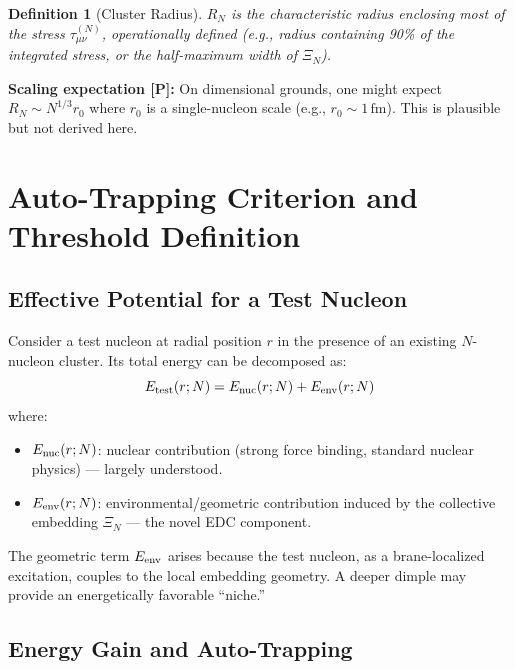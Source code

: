 \documentclass[11pt,a4paper]{article}
\newtheorem{definition}{Definition}
\newcommand{\Post}{\textsc{[P]}}
\begin{document}
\begin{definition}[Cluster Radius]
$R_N$ is the characteristic radius enclosing most of the stress
$\tau_{\mu\nu}^{(N)}$, operationally defined (e.g., radius containing 90\%
of the integrated stress, or the half-maximum width of $\Xi_N$).
\end{definition}

\textbf{Scaling expectation \Post:} On dimensional grounds, one might
expect $R_N \sim N^{1/3} r_0$ where $r_0$ is a single-nucleon scale
(e.g., $r_0 \sim 1\,\text{fm}$). This is plausible but not derived here.

\section{Auto-Trapping Criterion and Threshold Definition}
\label{sec:criterion}

\subsection{Effective Potential for a Test Nucleon}

Consider a test nucleon at radial position $r$ in the presence of an
existing $N$-nucleon cluster. Its total energy can be decomposed as:
\begin{equation}
E_{\rm test}(r; N) = E_{\rm nuc}(r; N) + E_{\rm env}(r; N)
\label{eq:etest}
\end{equation}
where:
\begin{itemize}
\item $E_{\rm nuc}(r; N)$: nuclear contribution (strong force binding,
standard nuclear physics) --- largely understood.
\item $E_{\rm env}(r; N)$: environmental/geometric contribution induced
by the collective embedding $\Xi_N$ --- the novel EDC component.
\end{itemize}

The geometric term $E_{\rm env}$ arises because the test nucleon, as a
brane-localized excitation, couples to the local embedding geometry.
A deeper dimple may provide an energetically favorable ``niche.''

\subsection{Energy Gain and Auto-Trapping}
\end{document}
